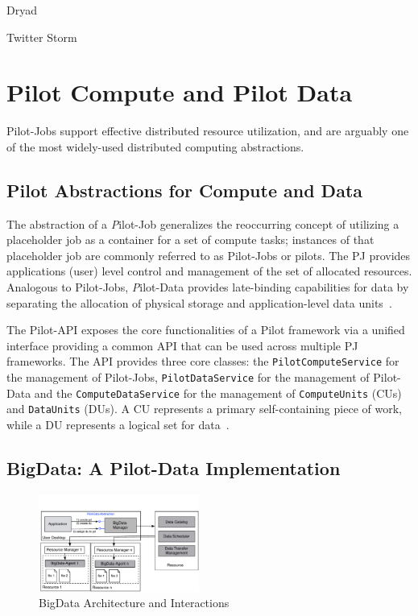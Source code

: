 \documentclass{acm_proc_article-sp}
\newcommand{\pilot}{Pilot\xspace}
\newcommand{\pilotjob}{Pilot-Job\xspace}
\newcommand{\pilotjobs}{Pilot-Jobs\xspace}
\begin{document}


Dryad

Twitter Storm

\section{Pilot Compute and Pilot Data}

Pilot-Jobs support effective distributed resource utilization, and are arguably one of the most widely-used distributed computing abstractions. 

\subsection{Pilot Abstractions for Compute and Data}

The abstraction of a {\emph \pilotjob} generalizes the reoccurring concept of
utilizing a placeholder job as a container for a set of compute tasks;
instances of that placeholder job are commonly referred to as Pilot-Jobs or
pilots. The PJ provides applications (user) level control and management of
the set of allocated resources. Analogous to \pilotjobs, {\emph Pilot-Data}
provides late-binding capabilities for data by separating the allocation of
physical storage and application-level data units~\cite{pstar-2012}.

The Pilot-API exposes the core functionalities of a \pilot framework via a
unified interface providing a common API that can be used across multiple PJ
frameworks. The API provides three core classes: the
\texttt{PilotComputeService} for the management of Pilot-Jobs,
\texttt{PilotDataService} for the management of Pilot-Data and the
\texttt{ComputeDataService} for the management of \texttt{ComputeUnits} (CUs)
and \texttt{DataUnits} (DUs). A CU represents a primary self-containing piece
of work, while a DU represents a logical set for data~\cite{pstar-2012}.

\subsection{BigData: A Pilot-Data Implementation}
\begin{figure}[htbp]
	\centering
		\includegraphics[width=0.47\textwidth]{figures/bigdata.pdf}
	\caption{BigData Architecture and Interactions}
	\label{fig:figures_bigdata}
\end{figure}
\end{document}

